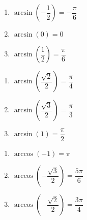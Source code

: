 \documentclass{ximera}
\begin{document}
\begin{multicols}{3} 

\begin{enumerate}

\setcounter{enumi}{\value{HW}}

\item $\arcsin \left( -\dfrac{1}{2} \right) = -\dfrac{\pi}{6}$
\item $\arcsin \left( 0 \right) = 0$ 
\item $\arcsin \left( \dfrac{1}{2} \right) = \dfrac{\pi}{6}$

\setcounter{HW}{\value{enumi}}

\end{enumerate}

\end{multicols}

\begin{multicols}{3} 

\begin{enumerate}

\setcounter{enumi}{\value{HW}}

\item $\arcsin \left( \dfrac{\sqrt{2}}{2} \right) = \dfrac{\pi}{4}$
\item $\arcsin \left( \dfrac{\sqrt{3}}{2} \right) = \dfrac{\pi}{3}$
\item $\arcsin \left( 1 \right) = \dfrac{\pi}{2}$ 

\setcounter{HW}{\value{enumi}}

\end{enumerate}

\end{multicols}

\begin{multicols}{3} 

\begin{enumerate}

\setcounter{enumi}{\value{HW}}

\item $\arccos \left( -1 \right) = \pi$ 
\item $\arccos \left( -\dfrac{\sqrt{3}}{2} \right) = \dfrac{5\pi}{6}$
\item $\arccos \left( -\dfrac{\sqrt{2}}{2} \right) = \dfrac{3\pi}{4}$

\setcounter{HW}{\value{enumi}}

\end{enumerate}

\end{multicols}
\end{document}
